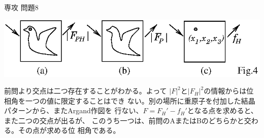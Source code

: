 \documentclass[fleqn]{jbook}
\begin{document}
\begin{answer}{専攻 問題8}{}
\begin{subanswers}
\begin{subsubanswers}
\begin{center}
\includegraphics[clip]{1993phy8-4.eps}
\end{center}

  \SubSubAnswer 
    前問より交点は二つ存在することがわかる。よって
    $|F|^2$と$|F_H|^2$の情報からは位相角を一つの値に限定することはでき
    ない。別の場所に重原子を付加した結晶パターンから、またArgand作図を
    行ない、$F=F_H'-f_H'$となる点を求めると、また二つの交点が出るが、
    このうち一つは、前問のAまたはBのどちらかと交わる。その点が求める位
    相角である。

  \end{subsubanswers}
\end{subanswers}
\end{answer}
\end{document}
